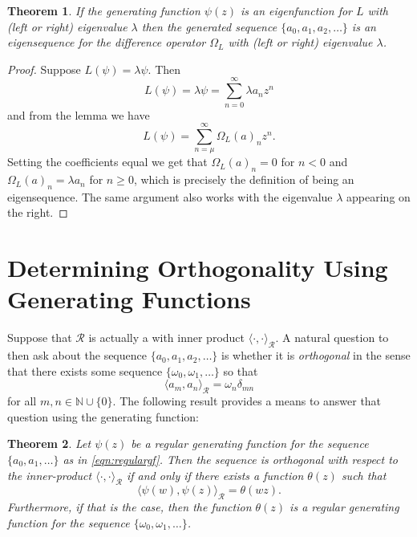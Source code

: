\documentclass{amsart}
\newtheorem{theorem}{Theorem}[section]
\theoremstyle{definition}
\theoremstyle{remark}
\numberwithin{equation}{section}
\def\R{\mathcal{R}}
\def\N{\mathbb{N}}
\def\zmin{\mu}
\begin{document}
\begin{theorem}\label{thm:main}
If the generating function $\psi(z)$ is an eigenfunction for $L$ with
(left or right) eigenvalue $\lambda$ then the generated sequence $\{a_0,a_1,a_2,\ldots\}$ is an eigensequence
for the difference operator $\Omega_L$ with (left or right) eigenvalue $\lambda$.
\end{theorem}
\begin{proof}
Suppose $L(\psi)=\lambda\psi$.
Then
  $$
  L(\psi)=\lambda\psi=\sum_{n=0}^{\infty}\lambda a_nz^n
  $$
  and from the lemma we have
$$
L(\psi)=\sum_{n=\zmin}^{\infty}\Omega_L(a)_nz^n.
$$
Setting the coefficients equal we get that $\Omega_L(a)_n=0$ for $n<0$
and $\Omega_L(a)_n=\lambda a_n$ for $n\geq0$, which is precisely the
definition of being an eigensequence.  The same argument also
works with the eigenvalue $\lambda$ appearing on the right.
\end{proof}

\section{Determining Orthogonality Using Generating Functions}
Suppose that $\R$ is actually a  with inner
product $\langle\cdot,\cdot\rangle_\R$.  A natural question to then ask
about the sequence $\{a_0,a_1,a_2,\ldots\}$ is whether it is
\textit{orthogonal} in the sense that there exists some sequence
$\{\omega_0,\omega_1,\ldots\}$ so that
\begin{equation}\label{eqn:orthogdef}
\langle a_m,a_n\rangle_\R=\omega_n\delta_{mn}
\end{equation}
for all $m,n\in\N\cup\{0\}$.
The following result provides a means to answer that question using
the generating function:
\begin{theorem}\label{thm:orthog}
Let $\psi(z)$ be a regular generating function for the sequence
$\{a_0,a_1,\ldots\}$ as in \eqref{eqn:regulargf}.  Then the sequence
is orthogonal with respect to the inner-product
$\langle\cdot,\cdot\rangle_\R$ if and only if there exists a function
$\theta(z)$ such that
$$
\langle \psi(w),\psi(z)\rangle_\R=\theta(wz).
$$
Furthermore, if that is the case, then the function $\theta(z)$ is a
regular generating function for the sequence $\{\omega_0,\omega_1,\ldots\}$.
\end{theorem}
\end{document}
